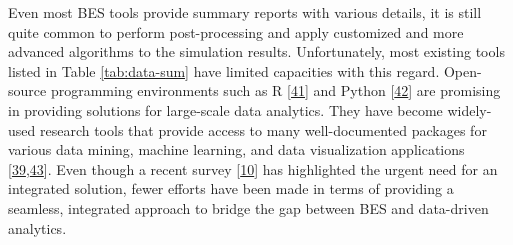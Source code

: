 \documentclass[3p, times]{elsarticle} %
\begin{document}
Even most BES tools provide summary reports with various details, it is still
quite common to perform post-processing and apply customized and more advanced
algorithms to the simulation results. Unfortunately, most existing tools listed
in Table \ref{tab:data-sum} have limited capacities with this regard.
Open-source programming environments such as R {[}\protect\hyperlink{ref-RCoreTeam2019}{41}{]} and Python
{[}\protect\hyperlink{ref-Oliphant2007}{42}{]} are promising in providing solutions for large-scale data
analytics. They have become widely-used research tools that provide access to
many well-documented packages for various data mining, machine learning, and
data visualization applications {[}\protect\hyperlink{ref-Molina-Solana2017}{39},\protect\hyperlink{ref-Lowndes2017}{43}{]}. Even though
a recent survey {[}\protect\hyperlink{ref-Srivastava2019}{10}{]} has highlighted the urgent need for an
integrated solution, fewer efforts have been made in terms of providing a
seamless, integrated approach to bridge the gap between BES and data-driven
analytics.

\setlength{\tabcolsep}{0.1pt}
\renewcommand{\arraystretch}{1.3}
\end{document}
